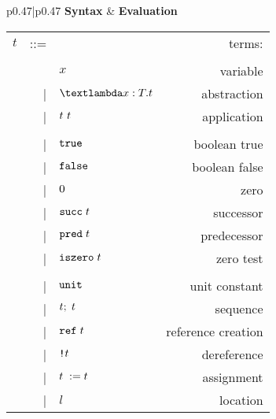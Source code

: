 \begin{figure*}[h]
\footnotesize
\begin{tabular}{p{}|p{}}
    \textbf{Syntax} & \textbf{Evaluation} \\[1em]
    \begin{tabular}{r@{\hspace{0.5em}}r@{\hspace{0.5em}}l@{\hspace{0.5em}}r}
        $t$ & ::= &                             & terms:              \\
            &     &                             &                     \\
            &     & $x$                         & variable            \\
            & |   & $\tyabs{x}{T}{t}$           & abstraction         \\
            & |   & $t\ t$                & application         \\
            &     &                             &                     \\
            & |   & $\texttt{true}$                     & boolean true        \\
            & |   & $\texttt{false}$                    & boolean false       \\
            & |   & $0$                     & zero                \\
            & |   & $\texttt{succ\;}t$                 & successor           \\
            & |   & $\texttt{pred\;}t$                 & predecessor         \\
            & |   & $\texttt{iszero\;}t$               & zero test           \\
            &     &                             &                     \\
            & |   & $\texttt{unit}$                     & unit constant       \\
            & |   & $t;\;t$                & sequence            \\
            & |   & $\texttt{ref\;}t$                  & reference creation  \\
            & |   & $\texttt{!}t$                 & dereference         \\
            & |   & $t\;:= t$             & assignment          \\
            & |   & $l$                         & location            \\

\end{tabular}
\end{tabular}
\end{figure*}
